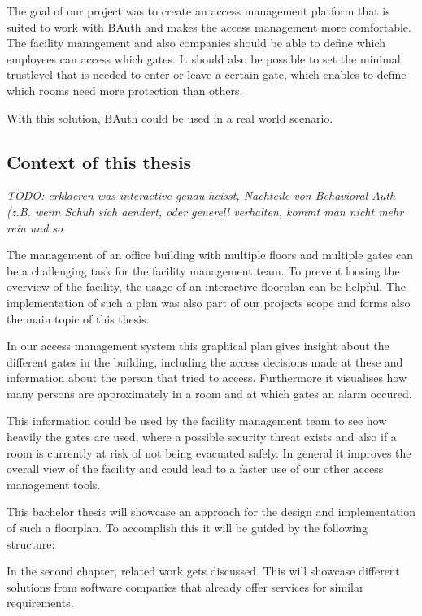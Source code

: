 The goal of our project was to create an access management platform that is suited to work with BAuth and makes the access management more comfortable. The facility management and also companies should be able to define which employees can access which gates. It should also be possible to set the minimal trustlevel that is needed to enter or leave a certain gate, which enables to define which rooms need more protection than others.

With this solution, BAuth could be used in a real world scenario.

\subsection{Context of this thesis}
\label{Context of this thesis}

\emph{TODO: erklaeren was interactive genau heisst, Nachteile von Behavioral Auth (z.B. wenn Schuh sich aendert, oder generell verhalten, kommt man nicht mehr rein und so}

The management of an office building with multiple floors and multiple gates can be a challenging task for the facility management team. To prevent loosing the overview of the facility, the usage of an interactive floorplan can be helpful. The implementation of such a plan was also part of our projects scope and forms also the main topic of this thesis.

In our access management system this graphical plan gives insight about the different gates in the building, including the access decisions made at these and information about the person that tried to access. Furthermore it visualises how many persons are approximately in a room and at which gates an alarm occured. 

This information could be used by the facility management team to see how heavily the gates are used, where a possible security threat exists and also if a room is currently at risk of not being evacuated safely. 
In general it improves the overall view of the facility and could lead to a faster use of our other access management tools.

This bachelor thesis will showcase an approach for the  design and implementation of such a floorplan. To accomplish this it will be guided by the following structure:

In the second chapter, related work gets discussed. This will showcase different solutions from software companies that already offer services for similar requirements.

